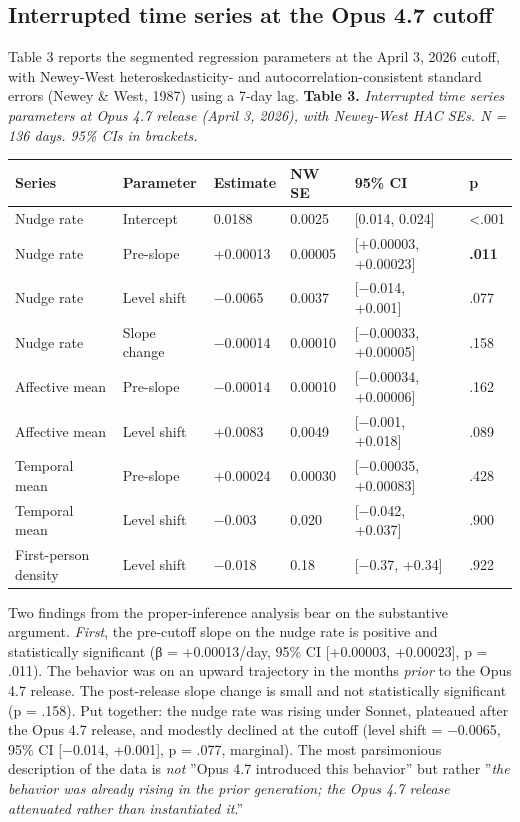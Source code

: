 \documentclass{obelus-preprint}
\begin{document}
\subsection{Interrupted time series at the Opus 4.7 cutoff}
Table 3 reports the segmented regression parameters at the April 3, 2026 cutoff, with Newey-West heteroskedasticity- and autocorrelation-consistent standard errors (Newey \& West, 1987) using a 7-day lag.
\textbf{Table 3.} \emph{Interrupted time series parameters at Opus 4.7 release (April 3, 2026), with Newey-West HAC SEs. N = 136 days. 95\% CIs in brackets.}
\begin{center}
\begin{tabular}{llllll}
\toprule
\textbf{Series} & \textbf{Parameter} & \textbf{Estimate} & \textbf{NW SE} & \textbf{95\% CI} & \textbf{p} \\
\midrule
Nudge rate & Intercept & 0.0188 & 0.0025 & [0.014, 0.024] & \textless{}.001 \\
Nudge rate & Pre-slope & +0.00013 & 0.00005 & [+0.00003, +0.00023] & \textbf{.011} \\
Nudge rate & Level shift & −0.0065 & 0.0037 & [−0.014, +0.001] & .077 \\
Nudge rate & Slope change & −0.00014 & 0.00010 & [−0.00033, +0.00005] & .158 \\
Affective mean & Pre-slope & −0.00014 & 0.00010 & [−0.00034, +0.00006] & .162 \\
Affective mean & Level shift & +0.0083 & 0.0049 & [−0.001, +0.018] & .089 \\
Temporal mean & Pre-slope & +0.00024 & 0.00030 & [−0.00035, +0.00083] & .428 \\
Temporal mean & Level shift & −0.003 & 0.020 & [−0.042, +0.037] & .900 \\
First-person density & Level shift & −0.018 & 0.18 & [−0.37, +0.34] & .922 \\
\bottomrule
\end{tabular}
\end{center}
Two findings from the proper-inference analysis bear on the substantive argument.
\emph{First}, the pre-cutoff slope on the nudge rate is positive and statistically significant (β = +0.00013/day, 95\% CI [+0.00003, +0.00023], p = .011). The behavior was on an upward trajectory in the months \emph{prior} to the Opus 4.7 release. The post-release slope change is small and not statistically significant (p = .158). Put together: the nudge rate was rising under Sonnet, plateaued after the Opus 4.7 release, and modestly declined at the cutoff (level shift = −0.0065, 95\% CI [−0.014, +0.001], p = .077, marginal). The most parsimonious description of the data is \emph{not} ''Opus 4.7 introduced this behavior'' but rather ''\emph{the behavior was already rising in the prior generation; the Opus 4.7 release attenuated rather than instantiated it}.''
\end{document}
